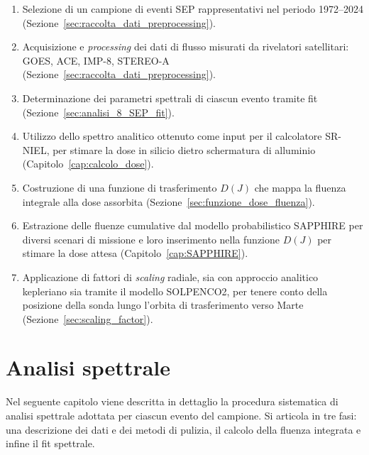 \documentclass[12pt]{report}
\begin{document}
\begin{enumerate}[nosep]
    \item Selezione di un campione di eventi SEP rappresentativi nel periodo 1972--2024 (Sezione~\ref{sec:raccolta_dati_preprocessing}).
    \item Acquisizione e \textit{processing} dei dati di flusso misurati da rivelatori satellitari: GOES, ACE, IMP-8, STEREO-A (Sezione~\ref{sec:raccolta_dati_preprocessing}).
    \item Determinazione dei parametri spettrali di ciascun evento tramite fit (Sezione~\ref{sec:analisi_8_SEP_fit}).
    \item Utilizzo dello spettro analitico ottenuto come input per il calcolatore SR-NIEL, per stimare la dose in silicio dietro schermatura di alluminio (Capitolo~\ref{cap:calcolo_dose}).    
    \item Costruzione di una funzione di trasferimento $D(J)$ che mappa la fluenza integrale alla dose assorbita (Sezione~\ref{sec:funzione_dose_fluenza}).
    \item Estrazione delle fluenze cumulative dal modello probabilistico SAPPHIRE per diversi scenari di missione e loro inserimento nella funzione $D(J)$ per stimare la dose attesa (Capitolo~\ref{cap:SAPPHIRE}).
    \item Applicazione di fattori di \textit{scaling} radiale, sia con approccio analitico kepleriano sia tramite il modello SOLPENCO2, per tenere conto della posizione della sonda lungo l'orbita di trasferimento verso Marte (Sezione~\ref{sec:scaling_factor}).
\end{enumerate}

\chapter{Analisi spettrale}\label{cap:analisi_spettrale}

Nel seguente capitolo viene descritta in dettaglio la procedura sistematica di analisi spettrale adottata per ciascun evento del campione. Si articola in tre fasi: una descrizione dei dati e dei metodi di pulizia, il calcolo della fluenza integrata e infine il fit spettrale.
\end{document}
